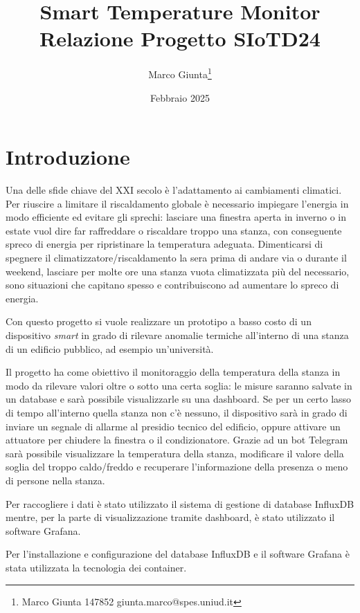 \documentclass[italian,12pt,a4paper,oneside,final]{report}
\title{\huge Smart Temperature Monitor\\[0.5em]
\large Relazione Progetto SIoTD24}
\date{Febbraio 2025}
\author{
Marco Giunta\thanks{Marco Giunta 147852 giunta.marco@spes.uniud.it}}
\begin{document}
\maketitle

\tableofcontents

\newpage

\section{Introduzione}
Una delle sfide chiave del XXI secolo è l’adattamento ai cambiamenti climatici.
Per riuscire a limitare il riscaldamento globale è necessario impiegare l’energia in modo efficiente ed evitare gli sprechi: lasciare una finestra aperta in inverno o in estate vuol dire far raffreddare o riscaldare troppo una stanza, con conseguente spreco di energia per ripristinare la temperatura adeguata.
Dimenticarsi di spegnere il climatizzatore/riscaldamento la sera prima di andare via o durante il weekend, lasciare per molte ore una stanza vuota climatizzata più del necessario, sono situazioni che capitano spesso e contribuiscono ad aumentare lo spreco di energia.

Con questo progetto si vuole realizzare un prototipo a basso costo di un dispositivo \emph{smart} in grado di rilevare anomalie termiche all'interno di una stanza di un edificio pubblico, ad esempio un'università.

Il progetto ha come obiettivo il monitoraggio della temperatura della stanza in modo da rilevare valori oltre o sotto una certa soglia: le misure saranno salvate in un database e sarà possibile visualizzarle su una dashboard.
Se per un certo lasso di tempo all'interno quella stanza non c'è nessuno, il dispositivo sarà in grado di inviare un segnale di allarme al presidio tecnico del edificio, oppure attivare un attuatore per chiudere la finestra o il condizionatore.
Grazie ad un bot Telegram sarà possibile visualizzare la temperatura della stanza, modificare il valore della soglia del troppo caldo/freddo e recuperare l’informazione della presenza o meno di persone nella stanza.

Per raccogliere i dati è stato utilizzato il sistema di gestione di database InfluxDB mentre, per la parte di visualizzazione tramite dashboard, è stato utilizzato il software Grafana.

Per l'installazione e configurazione del database InfluxDB e il software Grafana è stata utilizzata la tecnologia dei container.
\end{document}
